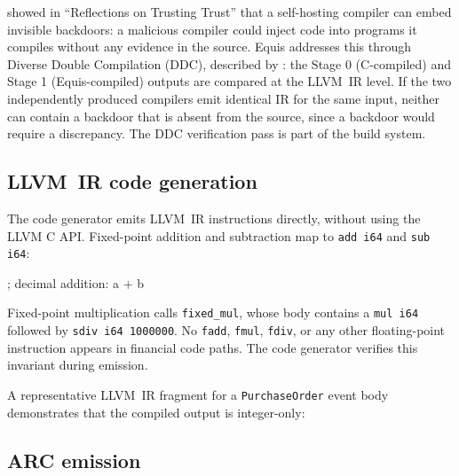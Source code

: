 \documentclass[11pt,a4paper]{article}
\theoremstyle{remark}
\begin{document}
\citet{thompson_reflections_1984} showed in ``Reflections on Trusting
Trust'' that a self-hosting compiler can embed invisible backdoors: a
malicious compiler could inject code into programs it compiles without
any evidence in the source. Equis addresses this through Diverse Double
Compilation (DDC), described by \citet{wheeler_fully_2009}: the Stage 0
(C-compiled) and Stage 1 (Equis-compiled) outputs are compared at the
LLVM~IR level. If the two independently produced compilers emit
identical IR for the same input, neither can contain a backdoor that is
absent from the source, since a backdoor would require a discrepancy.
The DDC verification pass is part of the build system.

\subsection{LLVM~IR code generation}

The code generator emits LLVM~IR instructions directly, without using
the LLVM C API. Fixed-point addition and subtraction map to
\texttt{add i64} and \texttt{sub i64}:

\begin{llvmcode}
; decimal addition: a + b
\end{llvmcode}

Fixed-point multiplication calls \texttt{fixed\_mul}, whose body
contains a \texttt{mul i64} followed by \texttt{sdiv i64 1000000}. No
\texttt{fadd}, \texttt{fmul}, \texttt{fdiv}, or any other floating-point
instruction appears in financial code paths. The code generator verifies
this invariant during emission.

A representative LLVM~IR fragment for a \texttt{PurchaseOrder} event
body demonstrates that the compiled output is integer-only:


\subsection{ARC emission}
\end{document}
